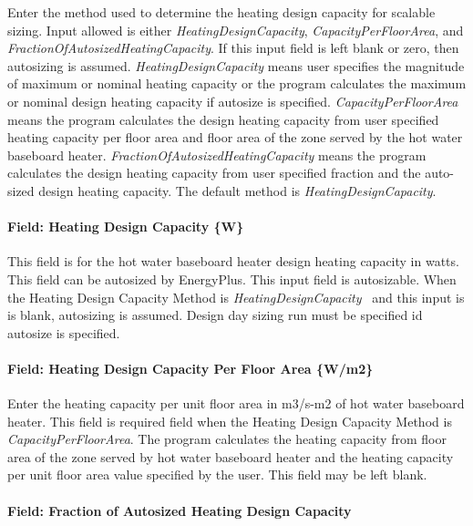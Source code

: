 Enter the method used to determine the heating design capacity for scalable sizing. Input allowed is either \emph{HeatingDesignCapacity}, \emph{CapacityPerFloorArea}, and \emph{FractionOfAutosizedHeatingCapacity}. If this input field is left blank or zero, then autosizing is assumed. \emph{HeatingDesignCapacity} means user specifies the magnitude of maximum or nominal heating capacity or the program calculates the maximum or nominal design heating capacity if autosize is specified. \emph{CapacityPerFloorArea} means the program calculates the design heating capacity from user specified heating capacity per floor area and floor area of the zone served by the hot water baseboard heater. \emph{FractionOfAutosizedHeatingCapacity} means the program calculates the design heating capacity from user specified fraction and the auto-sized design heating capacity. The default method is \emph{HeatingDesignCapacity}.

\paragraph{Field: Heating Design Capacity \{W\}}\label{field-heating-design-capacity-w-3}

This field is for the hot water baseboard heater design heating capacity in watts. This field can be autosized by EnergyPlus. This input field is autosizable. When the Heating Design Capacity Method is \emph{HeatingDesignCapacity}~ and this input is is blank, autosizing is assumed. Design day sizing run must be specified id autosize is specified.

\paragraph{Field: Heating Design Capacity Per Floor Area \{W/m2\}}\label{field-heating-design-capacity-per-floor-area-wm2-3}

Enter the heating capacity per unit floor area in m3/s-m2 of hot water baseboard heater. This field is required field when the Heating Design Capacity Method is \emph{CapacityPerFloorArea}. The program calculates the heating capacity from floor area of the zone served by hot water baseboard heater and the heating capacity per unit floor area value specified by the user. This field may be left blank.

\paragraph{Field: Fraction of Autosized Heating Design Capacity}\label{field-fraction-of-autosized-heating-design-capacity-3}

